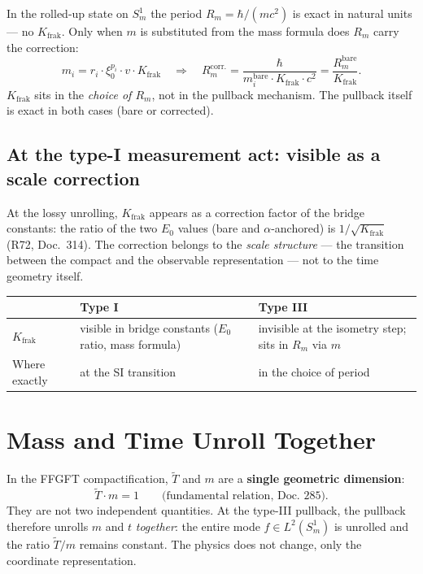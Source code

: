 In the rolled-up state on $S^1_m$ the period $R_m=\hbar/(mc^2)$ is
exact in natural units — no $K_{\text{frak}}$. Only when $m$ is
substituted from the mass formula does $R_m$ carry the correction:
\[
  m_i = r_i\cdot\xi_0^{p_i}\cdot v\cdot K_{\text{frak}}
  \quad\Rightarrow\quad
  R_m^{\text{corr.}} = \frac{\hbar}{m_i^{\text{bare}}\cdot K_{\text{frak}}\cdot c^2}
  = \frac{R_m^{\text{bare}}}{K_{\text{frak}}}.
\]
$K_{\text{frak}}$ sits in the \emph{choice of $R_m$}, not in the
pullback mechanism. The pullback itself is exact in both cases (bare
or corrected).

\subsection{At the type-I measurement act: visible as a scale correction}

At the lossy unrolling, $K_{\text{frak}}$ appears as a correction
factor of the bridge constants: the ratio of the two $E_0$ values
(bare and $\alpha$-anchored) is $1/\sqrt{K_{\text{frak}}}$ (R72,
Doc.~314). The correction belongs to the \emph{scale structure} —
the transition between the compact and the observable representation
— not to the time geometry itself.

\begin{center}
\begin{tabular}{lp{4.5cm}p{4.5cm}}
\toprule
 & \textbf{Type I} & \textbf{Type III} \\
\midrule
$K_{\text{frak}}$ & visible in bridge constants
  ($E_0$ ratio, mass formula) & invisible at the isometry step;
  sits in $R_m$ via $m$ \\
Where exactly & at the SI transition & in the choice of period \\
\bottomrule
\end{tabular}
\end{center}

\section{Mass and Time Unroll Together}

In the FFGFT compactification, $\tilde{T}$ and $m$ are a
\textbf{single geometric dimension}:
\[
  \tilde{T}\cdot m = 1 \qquad \text{(fundamental relation, Doc.~285)}.
\]
They are not two independent quantities. At the type-III pullback,
the pullback therefore unrolls $m$ and $t$ \emph{together}: the entire
mode $f\in L^2(S^1_m)$ is unrolled and the ratio $\tilde{T}/m$
remains constant. The physics does not change, only the coordinate
representation.

